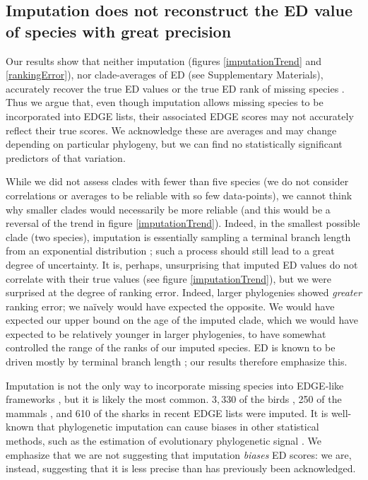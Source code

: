 \documentclass[10pt,english]{article}
\begin{document}
\subsection*{Imputation does not reconstruct the ED value of species with great precision}
Our results show that neither imputation (figures \ref{imputationTrend} and
\ref{rankingError}), nor clade-averages of ED (see Supplementary Materials),
accurately recover the true ED values or the true ED rank of missing species .
Thus we argue that, even though imputation allows missing species to be
incorporated into EDGE lists, their associated EDGE scores may not accurately
reflect their true scores. We acknowledge these are averages and may change
depending on particular phylogeny, but we can find no statistically significant
predictors of that variation.

While we did not assess clades with fewer than five species (we do not consider
correlations or averages to be reliable with so few data-points), we cannot
think why smaller clades would necessarily be more reliable (and this would be a
reversal of the trend in figure \ref{imputationTrend}). Indeed, in the smallest
possible clade (two species), imputation is essentially sampling a terminal
branch length from an exponential distribution \autocite{Kuhn2011}; such a
process should still lead to a great degree of uncertainty. It is, perhaps,
unsurprising that imputed ED values do not correlate with their true values (see
figure \ref{imputationTrend}), but we were surprised at the degree of ranking error.
Indeed, larger phylogenies showed \emph{greater} ranking error; we na\"{i}vely
would have expected the opposite. We would have expected our upper bound on the
age of the imputed clade, which we would have expected to be relatively younger
in larger phylogenies, to have somewhat controlled the range of the ranks of our
imputed species. ED is known to be driven mostly by terminal branch length
\autocite{Redding2008, Isaac2007, Steel2007}; our results therefore emphasize
this.

Imputation is not the only way to incorporate missing species into EDGE-like
frameworks \autocite[see][]{Collen2011,Gumbs2018}, but it is likely the most common.
$3,330$ of the birds \autocite[\textasciitilde30\%;][]{Jetz2014}, 250 of the mammals
\autocite[\textasciitilde 5.6\%;][]{Collen2011}, and 610 of the sharks
\autocite[\textasciitilde49\%;][]{Stein2018} in recent EDGE lists were imputed.
It is well-known that phylogenetic imputation can cause biases in other
statistical methods, such as the estimation of evolutionary phylogenetic signal
\autocite{Rabosky2015}. We emphasize that we are not suggesting that imputation
\emph{biases} ED scores: we are, instead, suggesting that it is less precise
than has previously been acknowledged.
\end{document}
